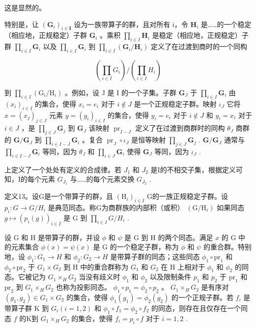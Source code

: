 这是显然的。

特别是，让 \((\mathbf{G}_{i})_{i\in\mathbf{I}}\) 设为一族带算子的群，且对所有 i，令 \(\mathbf{H}_i\) 是……的一个稳定（相应地，正规稳定）子群 \(\mathbf{G}_i\) 。乘积 \(\prod_{i\in I}\mathbf{H}_i\) 是稳定（相应地，正规稳定）子群 \(\prod_{i\in I}\mathbf{G}_i\) 以及 \(\prod_{i\in I}\mathbf{G}_i\) 到 \(\prod_{i\in I}(\mathbf{G}_i / \mathbf{H}_i)\) 定义了在过渡到商时的一个同构

\[
\left(\prod_ {i \in I} G _ {i}\right) / \left(\prod_ {i \in I} H _ {i}\right)
\]

到 \(\prod_{i\in I}(\mathrm{G}_i / \mathrm{H}_i)\) 。例如，设 J 是 I 的一个子集。子群 \(\mathbf{G}_{J}\) 于 \(\prod_{i\in I}\mathbf{G}_i\) 由 \((x_{i})_{i\in I}\) 的集合，使得 \(x_{i} = e_{i}\) 对于 \(i\notin J\) 是一个正规稳定子群。映射 \(\iota_{J}\) 它将 \(x = (x_{j})_{j\in J}\) 元素 \(y = (y_{i})_{i\in I}\) 的集合，使得 \(y_{i} = e_{i}\) 对于 \(i\notin J\) 和 \(y_{i} = x_{i}\) 对于 \(i\in J\) ，是 \(\prod_{j\in J}\mathbf{G}_j\) 到 \(\mathbf{G}_{J}\) 该映射 \(\operatorname{pr}_{I - J}\) 定义了在过渡到商群时的同构 \(\theta_J\) 商群的 \(\mathbf{G} / \mathbf{G}_J\) 到 \(\prod_{i\in I - J}\mathbf{G}_i\) 。复合 \(\operatorname{pr}_J\circ \iota_J\) 是恒等映射 \(\prod_{j\in J}\mathbf{G}_j\) . \(\mathbf{G} / \mathbf{G}_J\) 通常与 \(\prod_{i\in I - J}\mathbf{G}_i\) 等同，因为 \(\theta_J\) 和 \(\prod_{i\in J}\mathbf{G}_i\) 使得 \(\mathbf{G}_J\) 等同，因为 \(\iota_J\) .

上定义了一个处处有定义的合成律。若 \(J_{1}\) 和 \(J_{2}\) 是I的不相交子集，根据定义可知，I的每个元素 \(G_{J_{1}}\) 与……的每个元素交换 \(G_{J_{2}}\) .

定义13。设G是一个带算子的群，且 \((\mathrm{H}_{i})_{i\in I}\) G的一族正规稳定子群。设 \(p_{i}\colon G\to G/H_{i}\) 是典范同态。称G为商群族的内部积（或积） \((\mathrm{G}/\mathrm{H}_{i})\) 如果同态 \(g\mapsto(p_{i}(g))_{i\in I}\) 是 G 到 \(\prod_{i\in I}G/H_{i}\) .

设 G 和 H 是带算子的群，并设 \(\phi\) 和 \(\psi\) 是 G 到 H 的两个同态。满足 \(x\) 的 G 中的元素集合 \(\phi(x) = \psi(x)\) 是 G 的一个稳定子群，称为 \(\phi\) 和 \(\psi\) 的重合群。特别地，设 \(\phi_1: G_1 \to H\) 和 \(\phi_2: G_2 \to H\) 是带算子群的同态；这些同态 \(\phi_1 \circ \mathrm{pr}_1\) 和 \(\phi_2 \circ \mathrm{pr}_2\) 于 \(G_1 \times G_2\) 到 H 中的重合群称为 \(G_1\) 和 \(G_2\) 在 H 上相对于 \(\phi_1\) 和 \(\phi_2\) 的同态。它被记为 \(G_1 \times_H G_2\) 当没有歧义时 \(\phi_1\) 和 \(\phi_2\) 以及限制条件 \(p_1\) 和 \(p_2\) 于 \(\mathrm{pr}_1\) 和 \(\mathrm{pr}_2\) 到 \(G_1 \times_H G_2\) 也称为投影同态。 \(\phi_1 \circ p_1 = \phi_2 \circ p_2\) 。 \(G_1 \times_H G_2\) 是有序对 \((g_1, g_2) \in G_1 \times G_2\) 的集合，使得 \(\phi_1(g_1) = \phi_2(g_2)\) 的一个正规子群。若 \(f_i\) 是带算子群 K 到 \(G_i (i = 1, 2)\) 和 \(\phi_1 \circ f_1 = \phi_2 \circ f_2\) 的同态，则存在且仅存在一个同态 \(f\) 的K到 \(G_1 \times_H G_2\) 的集合，使得 \(f_i = p_i \circ f\) 对于 \(i = 1, 2\) .

